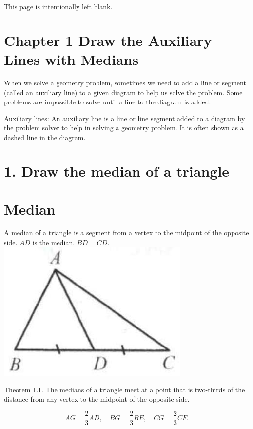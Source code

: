 \documentclass[10pt]{article}
\begin{document}
This page is intentionally left blank.

\section*{Chapter 1 Draw the Auxiliary Lines with Medians}
When we solve a geometry problem, sometimes we need to add a line or segment (called an auxiliary line) to a given diagram to help us solve the problem. Some problems are impossible to solve until a line to the diagram is added.

Auxiliary lines: An auxiliary line is a line or line segment added to a diagram by the problem solver to help in solving a geometry problem. It is often shown as a dashed line in the diagram.

\section*{1. Draw the median of a triangle}
\section*{Median}
A median of a triangle is a segment from a vertex to the midpoint of the opposite side. \(A D\) is the median. \(B D=C D\).\\
\includegraphics[max width=\textwidth, center]{2025_04_17_97bc1f7e44d93c271a88g-007(1)}

Theorem 1.1. The medians of a triangle meet at a point that is two-thirds of the distance from any vertex to the midpoint of the opposite side.

\[
A G=\frac{2}{3} A D, \quad B G=\frac{2}{3} B E, \quad C G=\frac{2}{3} C F .
\]
\end{document}
